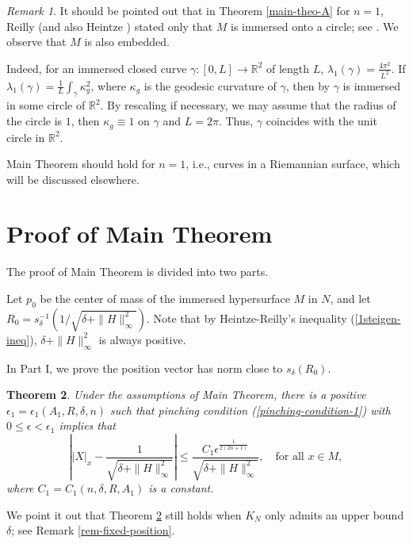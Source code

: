 \documentclass{amsart}
\numberwithin{equation}{section}
\newtheorem{theo}{Theorem}[section]
\theoremstyle{remark}
\newtheorem{rem}[theo]{Remark}
\renewcommand{\(}{\left(}
\renewcommand{\)}{\right)}
\renewcommand{\~}{\tilde}
\renewcommand{\-}{\overline}
\newcommand{\R}{\mathbb{R}}
\newcommand{\g}{\gamma}
\renewcommand{\d}{\delta}
\newcommand{\e}{\epsilon}
\renewcommand{\k}{\kappa}
\renewcommand{\l}{\lambda}
\newcommand{\ra}{\rightarrow}
\begin{document}
\begin{rem}
	It should be pointed out that in Theorem \ref{main-theo-A} for $n=1$, Reilly (and also Heintze \cite{Heintze1988}) stated only that $M$ is immersed onto a circle; see \cite[Theorem A]{Reilly1977}. We observe that $M$ is also embedded.
	
	Indeed, for an immersed closed curve $\g:[0,L]\ra \R^2$ of length $L$, $\l_1(\g)=\frac{4\pi^2}{L^2}$. If $\l_1(\g)=\frac{1}{L}\int_\g \k_g^2$, where $\k_g$ is the geodesic curvature of $\g$, then by \cite[Theorem A]{Reilly1977} $\g$ is immersed in some circle of $\R^2$. By rescaling if necessary, we may assume that the radius of the circle is $1$, then $\k_g\equiv 1$ on $\g$ and $L=2\pi$. Thus, $\g$ coincides with the unit circle in $\R^2$.
	
	Main Theorem should hold for $n=1$, i.e., curves in a Riemannian surface, which will be discussed elsewhere.
\end{rem}

\section{Proof of Main Theorem}\label{sec:3}


The proof of Main Theorem is divided into two parts.

Let $p_0$ be the center of mass of the immersed hypersurface $M$ in $N$, and let $R_0=s_\d^{-1}(1/\sqrt{\d+\|H\|_\infty^2})$. Note that by Heintze-Reilly's inequality (\ref{1steigen-ineq}), $\d+\|H\|_\infty^2$ is always positive.

In Part I, we prove the position vector has norm close to $s_\d(R_0)$.

\begin{theo}\label{main-theo-1}
	Under the assumptions of Main Theorem, there is a positive $\epsilon_1=\epsilon_1(A_1, R, \delta, n)$ such that  pinching condition (\ref{pinching-condition-1}) with $0\le \epsilon<\epsilon_1$ implies that
	\begin{equation}\label{main-theo-1.1}
	\left| |X|_x-\frac{1}{\sqrt{\d+\|H\|_\infty^2}}  \right| \leq \frac{C_1\e^\frac{1}{2(2n+1)}}{\sqrt{\d+\|H\|_\infty^2}}, \quad \text{for all $x\in M$},
	\end{equation}
	where $C_1=C_1(n,\d,R,A_1)$ is a constant.
\end{theo}

We point it out that Theorem  \ref{main-theo-1} still holds when $K_N$ only admits an upper bound $\d$; see Remark \ref{rem-fixed-position}.
\end{document}
